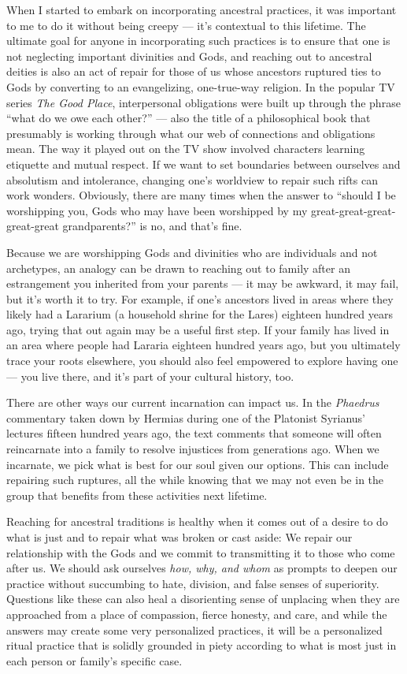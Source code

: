 \documentclass[
]{book}
\begin{document}
When I started to embark on incorporating ancestral practices, it was important to me to do it without being creepy --- it's contextual to this lifetime. The ultimate goal for anyone in incorporating such practices is to ensure that one is not neglecting important divinities and Gods, and reaching out to ancestral deities is also an act of repair for those of us whose ancestors ruptured ties to Gods by converting to an evangelizing, one-true-way religion. In the popular TV series \emph{The Good Place}, interpersonal obligations were built up through the phrase ``what do we owe each other?'' --- also the title of a philosophical book that presumably is working through what our web of connections and obligations mean. The way it played out on the TV show involved characters learning etiquette and mutual respect. If we want to set boundaries between ourselves and absolutism and intolerance, changing one's worldview to repair such rifts can work wonders. Obviously, there are many times when the answer to ``should I be worshipping you, Gods who may have been worshipped by my great-great-great-great-great grandparents?'' is no, and that's fine.

Because we are worshipping Gods and divinities who are individuals and not archetypes, an analogy can be drawn to reaching out to family after an estrangement you inherited from your parents --- it may be awkward, it may fail, but it's worth it to try. For example, if one's ancestors lived in areas where they likely had a Lararium (a household shrine for the Lares) eighteen hundred years ago, trying that out again may be a useful first step. If your family has lived in an area where people had Lararia eighteen hundred years ago, but you ultimately trace your roots elsewhere, you should also feel empowered to explore having one --- you live there, and it's part of your cultural history, too.

There are other ways our current incarnation can impact us. In the \emph{Phaedrus} commentary taken down by Hermias during one of the Platonist Syrianus' lectures fifteen hundred years ago, the text comments that someone will often reincarnate into a family to resolve injustices from generations ago. When we incarnate, we pick what is best for our soul given our options. This can include repairing such ruptures, all the while knowing that we may not even be in the group that benefits from these activities next lifetime.

Reaching for ancestral traditions is healthy when it comes out of a desire to do what is just and to repair what was broken or cast aside: We repair our relationship with the Gods and we commit to transmitting it to those who come after us. We should ask ourselves \emph{how, why, and whom} as prompts to deepen our practice without succumbing to hate, division, and false senses of superiority. Questions like these can also heal a disorienting sense of unplacing when they are approached from a place of compassion, fierce honesty, and care, and while the answers may create some very personalized practices, it will be a personalized ritual practice that is solidly grounded in piety according to what is most just in each person or family's specific case.
\end{document}

